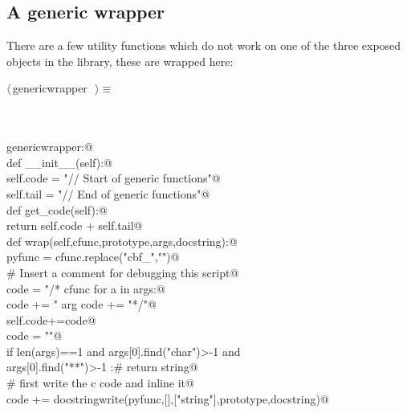 \documentclass[10pt,a4paper,twoside,notitlepage]{article}
\begin{document}
\subsection{A generic wrapper}

There are a few utility functions which do not work on one of the three exposed 
objects in the library, these are wrapped here:

\begin{flushleft} \small \label{scrap8}
$\langle\,$genericwrapper\nobreak\ {\footnotesize {}}$\,\rangle\equiv$
\vspace{-1ex}
\begin{list}{}{} \item
\mbox{}\verb@@\\
\mbox{}\verb@@\\
\mbox{}\verb@class genericwrapper:@\\
\mbox{}\verb@   def __init__(self):@\\
\mbox{}\verb@       self.code = "// Start of generic functions\n"@\\
\mbox{}\verb@       self.tail = "// End of generic functions\n"@\\
\mbox{}\verb@   def get_code(self):@\\
\mbox{}\verb@       return self.code + self.tail@\\
\mbox{}\verb@   def wrap(self,cfunc,prototype,args,docstring):@\\
\mbox{}\verb@       pyfunc = cfunc.replace("cbf_","")@\\
\mbox{}\verb@       # Insert a comment for debugging this script@\\
\mbox{}\verb@       code = "\n/* cfunc %s   pyfunc %s  \n"%(cfunc,pyfunc)@\\
\mbox{}\verb@       for a in args:@\\
\mbox{}\verb@           code += "   arg %s "%(a)@\\
\mbox{}\verb@       code += "*/\n\n"@\\
\mbox{}\verb@       self.code+=code@\\
\mbox{}\verb@       code = ""@\\
\mbox{}\verb@       if len(args)==1 and args[0].find("char")>-1 and \@\\
\mbox{}\verb@                           args[0].find("**")>-1                :# return string@\\
\mbox{}\verb@           # first write the c code and inline it@\\
\mbox{}\verb@           code += docstringwrite(pyfunc,[],["string"],prototype,docstring)@\\

\end{list}
\end{flushleft}
\end{document}
